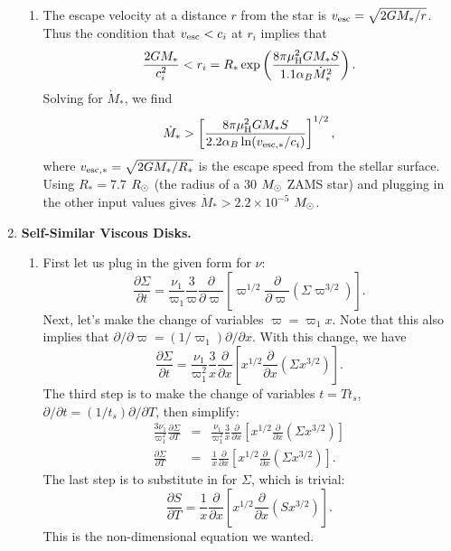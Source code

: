 \begin{enumerate}
\begin{enumerate}
\item The escape velocity at a distance $r$ from the star is $v_{\rm esc} = \sqrt{2 G M_*/r}$. Thus the condition that $v_{\rm esc} < c_i$ at $r_i$ implies that
\begin{displaymath}
\frac{2 G M_*}{c_i^2} <  r_i = R_* \exp\left(\frac{8\pi \mu_{\rm H}^2 G M_* S}{1.1 \alpha_B \dot{M}_*^2}\right).
\end{displaymath}
Solving for $\dot{M}_*$, we find
\begin{displaymath}
\dot{M}_* > \left[\frac{8\pi \mu_{\rm H}^2 G M_* S}{2.2\alpha_B \ln(v_{\rm esc,*}/c_i)}\right]^{1/2},
\end{displaymath}
where $v_{\rm esc,*} = \sqrt{2 G M_*/R_*}$ is the escape speed from the stellar surface. Using $R_*=7.7$ $R_{\odot}$ (the radius of a 30 $M_{\odot}$ ZAMS star) and plugging in the other input values gives $\dot{M}_*>2.2\times 10^{-5}$ $M_{\odot}$.

\end{enumerate}

\item \textbf{Self-Similar Viscous Disks.}

\begin{enumerate}

\item First let us plug in the given form for $\nu$:
\begin{displaymath}
\frac{\partial\Sigma}{\partial t} = \frac{\nu_1}{\varpi_1} \frac{3}{\varpi} \frac{\partial}{\partial \varpi} \left[\varpi^{1/2} \frac{\partial}{\partial \varpi} \left(\Sigma \varpi^{3/2}\right)\right].
\end{displaymath}
Next, let's make the change of variables $\varpi = \varpi_1 x$. Note that this also implies that $\partial /\partial \varpi = (1/\varpi_1) \partial/\partial x$. With this change, we have
\begin{displaymath}
\frac{\partial\Sigma}{\partial t} = \frac{\nu_1}{\varpi_1^2} \frac{3}{x} \frac{\partial}{\partial x} \left[x^{1/2} \frac{\partial}{\partial x} \left(\Sigma x^{3/2}\right)\right].
\end{displaymath}
The third step is to make the change of variables $t = T t_s$, $\partial/\partial t = (1/t_s) \partial/\partial T$, then simplify:
\begin{eqnarray*}
\frac{3\nu_1}{\varpi_1^2} \frac{\partial\Sigma}{\partial T} & = & \frac{\nu_1}{\varpi_1^2} \frac{3}{x} \frac{\partial}{\partial x} \left[x^{1/2} \frac{\partial}{\partial x} \left(\Sigma x^{3/2}\right)\right] \\
\frac{\partial\Sigma}{\partial T} & = & \frac{1}{x} \frac{\partial}{\partial x} \left[x^{1/2} \frac{\partial}{\partial x} \left(\Sigma x^{3/2}\right)\right].
\end{eqnarray*}
The last step is to substitute in for $\Sigma$, which is trivial:
\begin{displaymath}
\frac{\partial S}{\partial T} = \frac{1}{x} \frac{\partial}{\partial x} \left[x^{1/2} \frac{\partial}{\partial x} \left(S x^{3/2}\right)\right].
\end{displaymath}
This is the non-dimensional equation we wanted.


\end{enumerate}
\end{enumerate}
